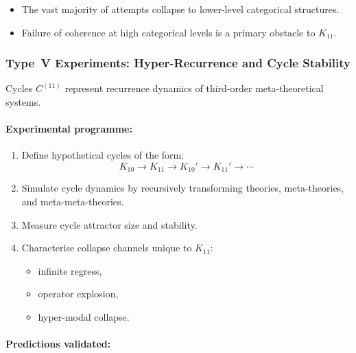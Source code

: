 \begin{itemize}
    \item The vast majority of attempts collapse to 
          lower-level categorical structures.
    \item Failure of coherence at high categorical levels is a 
          primary obstacle to $K_{11}$.
\end{itemize}



\subsubsection{Type~V Experiments: Hyper-Recurrence and Cycle Stability}

Cycles $C^{(11)}$ represent recurrence dynamics of third-order 
meta-theoretical systems.

\paragraph{Experimental programme:}

\begin{enumerate}
    \item Define hypothetical cycles of the form:
          \[
              K_{10}
                \longrightarrow
              K_{11}
                \longrightarrow
              K_{10}'
                \longrightarrow
              K_{11}'
                \longrightarrow \cdots
          \]
    \item Simulate cycle dynamics by recursively transforming 
          theories, meta-theories, and meta-meta-theories.
    \item Measure cycle attractor size and stability.
    \item Characterise collapse channels unique to $K_{11}$:
          \begin{itemize}
              \item infinite regress,
              \item operator explosion,
              \item hyper-modal collapse.
          \end{itemize}
\end{enumerate}

\paragraph{Predictions validated:}

